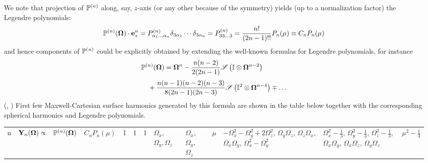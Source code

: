 We note that projection of $\mathbb{P}^{(n)}$ along, say, $z$-axis (or any other because of the symmetry) yields (up to a
normalization factor) the Legendre polynomials:
\begin{equation}\label{eq:leg2}
  \mathbb{P}^{(n)}(\mathbf{\Omega})\cdot\mathbf{e}_z^n = P^{(n)}_{\alpha_1\ldots\alpha_n}\delta_{3\alpha_1}\cdots\delta_{3\alpha_n} = P^{(n)}_{33\ldots3} = \frac{n!}{(2n-1)!!}P_n(\mu) \equiv C_n P_n(\mu)
\end{equation}
and hence components of $\mathbb{P}^{(n)}$ could be explicitly obtained by extending the well-known formulas for Legendre 
polynomials, for instance
\begin{equation}\label{eq:conn1}
\begin{multlined}
  \PP(\bomega) = \bomega^n - \frac{n(n-2)}{2(2n-1)}\Sym{\eye\otimes\bomega^{n-2}}\\[.2em] +
  \frac{n(n-1)(n-2)(n-3)}{8(2n-1)(2n-3)}\Sym{\eye^2\otimes\bomega^{n-4}}\mp\ldots
  \end{multlined}
\end{equation}
(\cite[Chap. VI]{Byerly}, \cite{Johnston1})
First few Maxwell-Cartesian surface harmonics generated by this formula are shown in the table below together with the 
corresponding spherical harmonics and Legendre polynomials.
\begin{center}
	\begin{tabular}{|A|B|C|D|}
	  \hline
		n & $\mathbf{Y}_{n}(\mathbf{\Omega})\propto$ & $\mathbb{P}^{(n)}(\mathbf{\Omega})$ & $C_n P_n(\mu)$  & 1 & 1 & 1 & $\Omega_x$, $\Omega_y, \Omega_z$ & $\Omega_x$, $\Omega_y$, $\Omega_z$ & $\mu$  & $-\Omega_x^2-\Omega_y^2 + 2\Omega_z^2$, 
		    $\Omega_y\Omega_z$, 
		    $\Omega_z\Omega_x$,
		    $\Omega_x\Omega_y$,
		    $\Omega_x^2 - \Omega_y^2$ & $\Omega_x^2-\tfrac13$, 
		                                $\Omega_y^2-\tfrac13$, 
		                                $\Omega_z^2-\tfrac13$, 
		                                $\Omega_x\Omega_y$, 
		                                $\Omega_x\Omega_z$, 
		                                $\Omega_y\Omega_z$ & $\mu^2 - \tfrac13$ \nl
	\end{tabular}
	\label{tab:harmonics}
\end{center}
